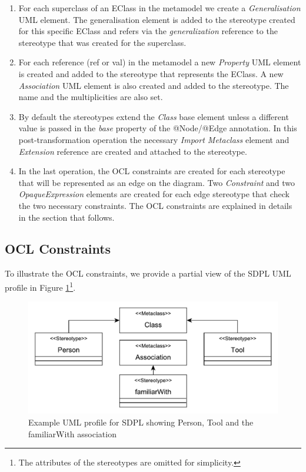 \begin{enumerate}[label=\arabic*)]
	\item For each superclass of an EClass in the metamodel we create a \textit{Generalisation} UML element. 
	The generalisation element is added to the stereotype created for this specific EClass and refers via the \textit{generalization} reference to the stereotype that was created for the superclass.
	\item For each reference (ref or val) in the metamodel a new \textit{Property} UML element is created and added to the stereotype that represents the EClass. 
	A new \textit{Association} UML element is also created and added to the stereotype. The name and the multiplicities are also set.
	\item By default the stereotypes extend the \textit{Class} base element unless a different value is passed in the \textit{base} property of the @Node/@Edge annotation. 
	In this post-transformation operation the necessary \textit{Import Metaclass} element and \textit{Extension} reference are created and attached to the stereotype.
	\item In the last operation, the OCL constraints are created for each stereotype that will be represented as an edge on the diagram. 
	Two \textit{Constraint} and two \textit{OpaqueExpression} elements are created for each edge stereotype that check the two necessary constraints. 
	The OCL constraints are explained in details in the section that follows.
\end{enumerate}

\subsection{OCL Constraints}
\label{sec:constraints}

To illustrate the OCL constraints, we provide a partial view of the SDPL UML profile in Figure \ref{fig:sample_profile}\footnote{The attributes of the stereotypes are omitted for simplicity.}.

\begin{figure}[ht!]
	\centering
	\includegraphics[width=1\textwidth]{diagrams/example_profile}
	\caption[]{Example UML profile for SDPL showing Person, Tool and the familiarWith association}
	\label{fig:sample_profile}
\end{figure}

